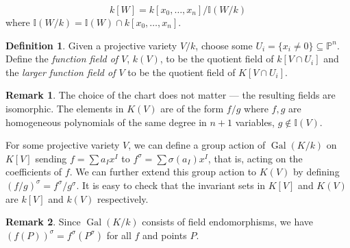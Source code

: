 \documentclass[12pt]{article}
\theoremstyle{remark}
\theoremstyle{definition}
\newtheorem{remark}{Remark}[subsection]
\newtheorem{definition}{Definition}[subsection]
\newcommand{\s}[0]{\sigma}
\newcommand{\Gal}[0]{\operatorname{Gal}}
\begin{document}
        \[k[W]=k[x_0,\dots,x_n]/\mathbb I(W/k)\]
        where $\mathbb I(W/k)=\mathbb I(W)\cap k[x_0,\dots,x_n]$.
        \begin{definition}
            Given a projective variety $V/k$, choose some $U_i=\{x_i\neq 0\}\subseteq \mathbb P^n$. Define the \textit{function field of $V$}, $k(V)$, to be the quotient field of $k[V\cap U_i]$ and the \textit{larger function field of $V$} to be the quotient field of $K[V\cap U_i]$.
        \end{definition}
        \begin{remark}
            The choice of the chart does not matter --- the resulting fields are isomorphic. The elements in $K(V)$ are of the form $f/g$ where $f, g$ are homogeneous polynomials of the same degree in $n+1$ variables, $g\notin\mathbb I(V)$.
        \end{remark}
        For some projective variety $V$, we can define a group action of $\Gal(K/k)$ on $K[V]$ sending $f=\sum a_{I}x^I$ to $f^\s=\sum \s(a_I)x^I$, that is, acting on the coefficients of $f$. We can further extend this group action to $K(V)$ by defining $(f/g)^\s=f^\s/g^\s$. It is easy to check that the invariant sets in $K[V]$ and $K(V)$ are $k[V]$ and $k(V)$ respectively.
        \begin{remark}\label{remark-gal-on-rational}
            Since $\Gal(K/k)$ consists of field endomorphisms, we have $(f(P))^\s=f^\s(P^\s)$ for all $f$ and points $P$.
        \end{remark}
        
\end{document}
